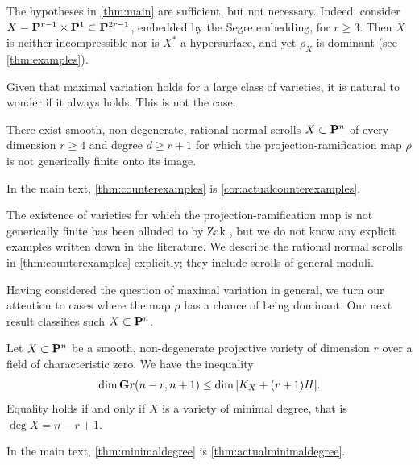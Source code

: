 \documentclass[11pt,reqno]{amsart}
\theoremstyle{plain}
\theoremstyle{definition}
\theoremstyle{remark}
\numberwithin{equation}{section}
\numberwithin{equation}{section}
\begin{document}
The hypotheses in \autoref{thm:main} are sufficient, but not necessary.
Indeed, consider $X = \P^{r-1} \times \P^1 \subset \P^{2r-1}$, embedded by the Segre embedding, for $r \geq 3$.
Then $X$ is neither incompressible nor is $X^*$ a hypersurface, and yet $\rho_X$ is dominant (see \autoref{thm:examples}).

Given that maximal variation holds for a large class of varieties, it is natural to wonder if it always holds.
This is not the case.
\begin{maintheorem}
  \label{thm:counterexamples}
  There exist smooth, non-degenerate, rational normal scrolls $X \subset \P^{n}$ of every dimension $r \geq 4$ and degree $d \geq r+1$ for which the projection-ramification map $\rho$ is not generically finite onto its image.
\end{maintheorem}
In the main text, \autoref{thm:counterexamples} is \autoref{cor:actualcounterexamples}.

The existence of varieties for which the projection-ramification map is not generically finite has been alluded to by Zak \cite{zak:}, but we do not know any explicit examples written down in the literature.
We describe the rational normal scrolls in \autoref{thm:counterexamples} explicitly; they include scrolls of general moduli.

Having considered the question of maximal variation in general, we turn our attention to cases where the map $\rho$ has a chance of being dominant.
Our next result classifies such $X \subset \P^n$.
\begin{maintheorem}\label{thm:minimaldegree}
  Let $X \subset \P^{n}$ be a smooth, non-degenerate projective variety of dimension $r$ over a field of characteristic zero.
  We have the inequality
  \[ \dim \Gr(n-r, n+1) \leq \dim |K_X + (r+1)H|.\]
  Equality holds if and only if $X$ is a variety of minimal degree, that is $\deg X = n-r+1$.
\end{maintheorem}
In the main text, \autoref{thm:minimaldegree} is \autoref{thm:actualminimaldegree}.
\end{document}
